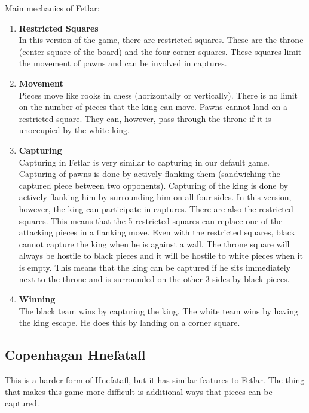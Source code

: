 \documentclass[11pt, oneside]{article}
\begin{document}
Main mechanics of Fetlar:
\begin{enumerate}
\item \textbf{Restricted Squares}\\
  In this version of the game, there are restricted squares.  These are the throne (center square of the board) and the four corner squares.  These squares limit the movement of pawns and can be involved in captures.
\item \textbf{Movement}\\
  Pieces move like rooks in chess (horizontally or vertically).
  There is no limit on the number of pieces that the king can move.
  Pawns cannot land on a restricted square.  They can, however, pass through the throne if it is unoccupied by the white king.
\item \textbf{Capturing}\\
  Capturing in Fetlar is very similar to capturing in our default game.  Capturing of pawns is done by actively flanking them (sandwiching the captured piece between two opponents).  Capturing of the king is done by actively flanking him by surrounding him on all four sides.  In this version, however, the king can participate in captures.  There are also the restricted squares.  This means that the 5 restricted squares can replace one of the attacking pieces in a flanking move.  Even with the restricted squares, black cannot capture the king when he is against a wall.  The throne square will always be hostile to black pieces and it will be hostile to white pieces when it is empty. This means that the king can be captured if he sits immediately next to the throne and is surrounded on the other 3 sides by black pieces.
\item \textbf{Winning}\\
  The black team wins by capturing the king.  The white team wins by having the king escape.  He does this by landing on a corner square.
\end{enumerate}

\subsection{Copenhagan Hnefatafl}
This is a harder form of Hnefatafl, but it has similar features to Fetlar.  The thing that makes this game more difficult is additional ways that pieces can be captured.
\end{document}
